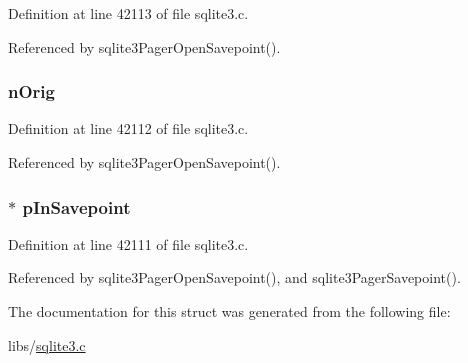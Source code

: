 Definition at line 42113 of file sqlite3.\+c.



Referenced by sqlite3\+Pager\+Open\+Savepoint().

\hypertarget{struct_pager_savepoint_a12bf72a8589b4dea3ac4af0c87eb8e17}{}
\subsubsection[{n\+Orig}]{ n\+Orig}\label{struct_pager_savepoint_a12bf72a8589b4dea3ac4af0c87eb8e17}


Definition at line 42112 of file sqlite3.\+c.



Referenced by sqlite3\+Pager\+Open\+Savepoint().

\hypertarget{struct_pager_savepoint_a6480e6f4cc03ee3e484e9ba1a183b330}{}
\subsubsection[{p\+In\+Savepoint}]{$\ast$ p\+In\+Savepoint}\label{struct_pager_savepoint_a6480e6f4cc03ee3e484e9ba1a183b330}


Definition at line 42111 of file sqlite3.\+c.



Referenced by sqlite3\+Pager\+Open\+Savepoint(), and sqlite3\+Pager\+Savepoint().



The documentation for this struct was generated from the following file\+:\begin{DoxyCompactItemize}
\item 
libs/\hyperlink{sqlite3_8c}{sqlite3.\+c}\end{DoxyCompactItemize}
